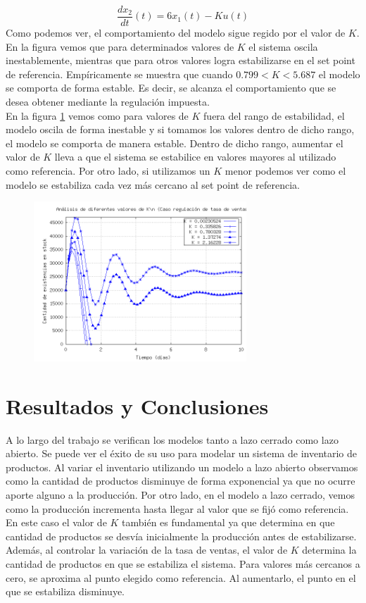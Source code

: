 \documentclass{sig-alternate}
\begin{document}
\begin{equation}
 \label{eq:x_2dot}
 \frac{dx_{2}}{dt}(t) = 6x_1(t) - Ku(t)
\end{equation}
Como podemos ver, el comportamiento del modelo sigue regido por el valor de $K$. En la figura vemos que para determinados valores de $K$ el sistema
oscila inestablemente, mientras que para otros valores logra estabilizarse en el set point de referencia. Empíricamente se muestra que cuando $0.799 < K < 5.687$ el modelo se comporta de forma estable. 
Es decir, se alcanza el comportamiento que se desea obtener mediante la regulación impuesta.\\
En la figura \ref{fig:lazo_cerrado_var_tventas} vemos como para valores de $K$ fuera del rango de estabilidad, el modelo oscila de
forma inestable y si tomamos los valores dentro de dicho rango, el modelo se comporta de manera estable. Dentro de dicho rango, aumentar el 
valor de $K$ lleva a que el sistema se estabilice en valores mayores al utilizado como referencia. Por otro lado, si utilizamos un $K$ menor podemos ver como el 
modelo se estabiliza cada vez más cercano al set point de referencia.

\begin{figure}[h]
\begin{center}
\includegraphics[width=8cm]{../src/k_plot2.png}
\caption{\label{fig:lazo_cerrado_var_tventas} }
\end{center}
\end{figure}

\section{Resultados y Conclusiones}
\label{results_and_conclusions_section}
A lo largo del trabajo se verifican los modelos tanto a lazo cerrado como lazo abierto. Se puede ver el éxito de su uso para modelar un sistema
de inventario de productos. Al variar el inventario utilizando un modelo a lazo abierto observamos como la cantidad de productos disminuye de
forma exponencial ya que no ocurre aporte alguno a la producción.  Por otro lado, en el modelo a lazo cerrado, vemos como la producción 
incrementa hasta llegar al valor que se fijó como referencia. En este caso el valor de $K$ también es fundamental ya que determina
en que cantidad de productos se desvía inicialmente la producción antes de estabilizarse. Además, al controlar la variación de la tasa de ventas,
el valor de $K$ determina la cantidad de productos en que se estabiliza el sistema. Para valores más cercanos a cero, se aproxima al punto
elegido como referencia. Al aumentarlo, el punto en el que se estabiliza disminuye.


\nocite{*}

\end{document}
